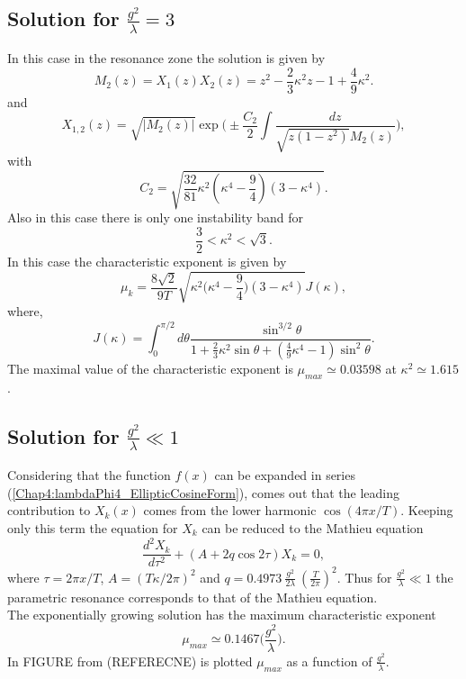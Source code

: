 \documentclass[11pt,a4paper,twoside]{book}
\begin{document}
\subsection{Solution for $ \frac{g^{2}}{\lambda}=3 $}
In this case in the resonance zone the solution is given by
\begin{equation}
\label{Chap4:lambdaPhi4_MzsecondSolution}
M_{2}(z)=X_{1}(z)X_{2}(z)=z^{2}-\frac{2}{3}\kappa^{2}z-1+\frac{4}{9}\kappa^{2}.
\end{equation}
and
\begin{equation}
	\label{Chap4:lambdaPhi4_ChiSolution2}
	X_{1,2}(z)=\sqrt{|M_{2}(z)|}\exp\Bigg(\pm \frac{C_{2}}{2}\int \frac{dz}{\sqrt{z(1-z^{2})} M_{2}(z)}\Bigg),
\end{equation}
with
\begin{equation}
\label{Chap4:lambdaPhi4_Csolution2}
C_{2}=\sqrt{\frac{32}{81}\kappa^{2}(\kappa^{4}-\frac{9}{4})(3-\kappa^{4})}.
\end{equation}
Also in this case there is only one instability band for 
\begin{equation}
\label{Chap4:lambdaPhi4_instabilityBandSolution2}
\frac{3}{2}<\kappa^{2}<\sqrt{3}.
\end{equation}
In this case the characteristic exponent is given by
\begin{equation}
\label{Chap4:lambdaPhi4_uksolution2}
\mu_{k}=\frac{8\sqrt{2}}{9T}\sqrt{\kappa^{2}\Bigg(\kappa^{4}-\frac{9}{4}\Bigg)(3-\kappa^{4})} J(\kappa),
\end{equation}
where,
\begin{equation}
\label{Chap4:lambdaPhi4_Jk}
J(\kappa) = \int_{0}^{\pi/2}d \theta \frac{\sin^{3/2} \theta}{1+\frac{2}{3}\kappa^{2}\sin \theta + (\frac{4}{9}\kappa^{4}-1)\sin^{2}\theta}.
\end{equation}
The maximal value of the characteristic exponent is $ \mu_{max}\simeq 0.03598 $ at $ \kappa^{2}\simeq 1.615 $.
\subsection{Solution for $ \frac{g^{2}}{\lambda} \ll 1 $}
Considering that the function $ f(x) $ can be expanded in series (\ref{Chap4:lambdaPhi4_EllipticCosineForm}), comes out that the leading contribution to $ X_{k}(x) $ comes from the lower harmonic $ \cos(4\pi x/T) $. Keeping only this term the equation for $ X_{k} $ can be reduced to the Mathieu equation
\begin{equation}
\label{Chap4:lambdaPhi4_MathieuEquationCase}
\frac{d^{2}X_{k}}{d\tau^{2}} + (A+2q\cos 2\tau)X_{k}=0,
\end{equation}
where $ \tau=2\pi x/T $, $ A=(T\kappa/2\pi)^{2} $ and $ q=0.4973\ \frac{g^{2}}{2\lambda}\ (\frac{T}{2\pi})^{2} $. Thus for $ \frac{g^{2}}{\lambda} \ll 1 $ the parametric resonance corresponds to that of the Mathieu equation. \\
The exponentially growing solution has the maximum characteristic exponent
\begin{equation}
\mu_{max} \simeq 0.1467 \Bigg(\frac{g^{2}}{\lambda}\Bigg).
\end{equation}
In FIGURE from (REFERECNE) is plotted $ \mu_{max} $ as a function of $ \frac{g^{2}}{\lambda} $.
\end{document}

